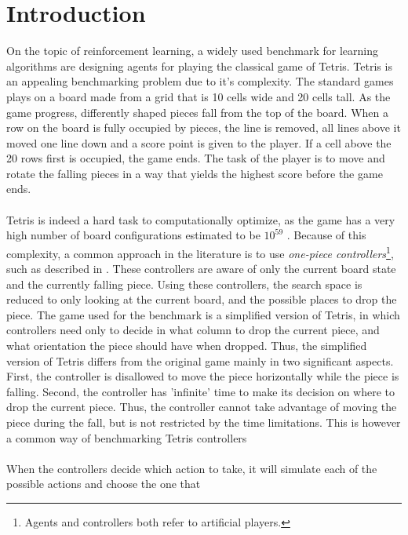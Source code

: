 \section{Introduction \label{sec:intro}}

On the topic of reinforcement learning, a widely used benchmark
for learning algorithms are designing agents 
for playing the classical game of Tetris. Tetris is an 
appealing benchmarking problem due to it's complexity. The 
standard games plays on a board made from a grid that is
10 cells wide and 20 cells tall. As the game progress, differently
shaped pieces fall from the top of the board. 
When a row on the board is fully occupied by pieces, the line
is removed, all lines above it moved one line down and a score
point is given to the player. If a cell above the 20 rows first is
occupied, the game ends. The task of the player is to move
and rotate the falling pieces in a way that yields the highest 
score before the game ends.\\
\\
Tetris is indeed a hard task to computationally optimize, as
the game has a very high number of board configurations estimated to be
$10^{59}$ \citep{scherrer2009}. Because of this
complexity, a common approach 
in the literature is to use 
\textit{one-piece controllers}\footnote{Agents and controllers
both refer to artificial players.}, such as described in 
\cite{scherrer2009:b}. These controllers are aware of only 
the current board state and the currently falling piece.
Using these controllers, the search space is reduced 
to only looking at the current board, and the possible 
places to drop the piece. The 
game used for the benchmark is a simplified version of Tetris,
in which 
controllers need only to decide in what column to drop the current
piece, and what orientation the piece should have when dropped.
Thus, the simplified version of Tetris differs from the 
original game mainly in two significant aspects. 
First, the controller is 
disallowed to move the piece horizontally while the piece 
is falling. Second, the controller has 'infinite'
time to make its decision on where to drop the current piece.
Thus, the controller cannot take advantage of moving the piece 
during the fall, but is not restricted by the time limitations.
This is however a common way of benchmarking Tetris controllers 
\citep{scherrer2009}\\
\\
When the controllers decide which action to take, it will
simulate each of the possible actions and choose the one that
